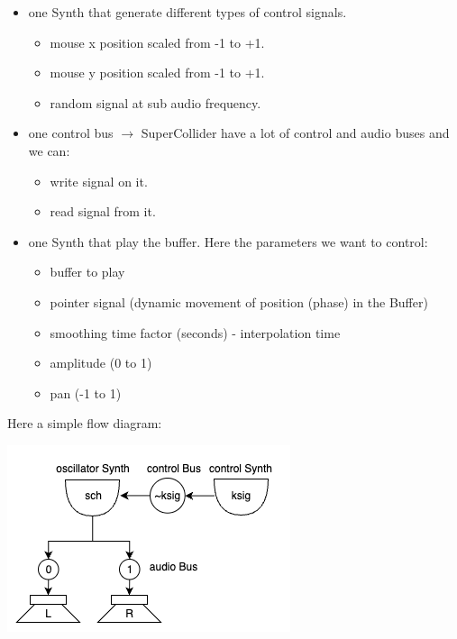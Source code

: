 \begin{itemize}
\tightlist
\item one Synth that generate different types of control signals.
  \begin{itemize}
  \tightlist
  \item mouse x position scaled from -1 to +1.
  \item mouse y position scaled from -1 to +1.
  \item random signal at sub audio frequency.
  \end{itemize}
\item one control bus $\rightarrow$ SuperCollider have a lot of control and audio buses and we can:
  \begin{itemize}
  \tightlist
  \item write signal on it.
  \item read signal from it.
  \end{itemize}
\item one Synth that play the buffer. Here the parameters we want to control:
  \begin{itemize}
  \tightlist
  \item buffer to play
  \item pointer signal (dynamic movement of position (phase) in the Buffer)
  \item smoothing time factor (seconds) - interpolation time
  \item amplitude (0 to 1)
  \item pan (-1 to 1)
  \end{itemize}
\end{itemize}

Here a simple flow diagram:

\begin{center}
\includegraphics[scale=0.7]{../img/kbus.png}
\end{center}

